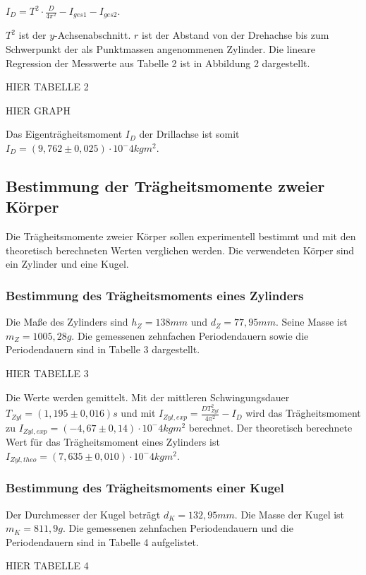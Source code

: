     $I_D = T^2 \cdot \frac{D}{4\pi^2} -I_{ges1} -I_{ges2}$.

    $T^2$ ist der $y$-Achsenabschnitt.
    $r$ ist der Abstand von der Drehachse bis zum Schwerpunkt
    der als Punktmassen angenommenen Zylinder.
    Die lineare Regression der Messwerte aus Tabelle 2 ist in
    Abbildung 2 dargestellt.

    HIER TABELLE 2

    HIER GRAPH

    Das Eigenträgheitsmoment $I_D$ der Drillachse ist somit
    $I_D = (9,762 \pm 0,025) \cdot 10^-4 kg m^2$.

    \subsection{Bestimmung der Trägheitsmomente zweier Körper}
    Die Trägheitsmomente zweier Körper sollen experimentell bestimmt
    und mit den theoretisch berechneten Werten verglichen werden.
    Die verwendeten Körper sind ein Zylinder und eine Kugel.

    \subsubsection{Bestimmung des Trägheitsmoments eines Zylinders}
    Die Maße des Zylinders sind $h_Z = 138 mm$ und $d_Z = 77,95 mm$.
    Seine Masse ist $m_Z = 1005,28g$.
    Die gemessenen zehnfachen Periodendauern sowie die Periodendauern
    sind in Tabelle 3 dargestellt.

    HIER TABELLE 3

    Die Werte werden gemittelt. Mit der mittleren Schwingungsdauer $T_{Zyl} = (1,195 \pm 0,016) s$ und mit $I_{Zyl,exp} = \frac{DT_{Zyl}^2}{4\pi^2} -I_D$ wird das Trägheitsmoment zu
    $I_{Zyl,exp} = (-4,67 \pm 0,14) \cdot 10^-4 kg m^2$ berechnet.
    Der theoretisch berechnete Wert für das Trägheitsmoment eines
    Zylinders ist $I_{Zyl,theo} = (7,635 \pm 0,010) \cdot 10^-4 kg m^2$.


    \subsubsection{Bestimmung des Trägheitsmoments einer Kugel}
    Der Durchmesser der Kugel beträgt $d_K = 132,95 mm$. Die Masse
    der Kugel ist $m_K = 811,9 g$.
    Die gemessenen zehnfachen Periodendauern und die Periodendauern
    sind in Tabelle 4 aufgelistet.

    HIER TABELLE 4

